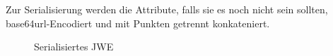 Zur Serialisierung werden die Attribute, falls sie es noch nicht sein sollten,
base64url-Encodiert und mit Punkten getrennt konkateniert.

\begin{figure}[h]
    \scalebox{.8}{
        
    }
    \caption{Serialisiertes JWE}\label{ls: serializedJWE}
\end{figure}
